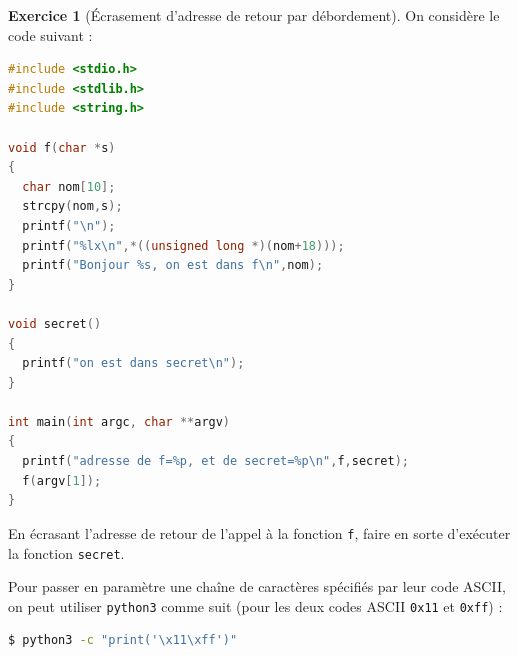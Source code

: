 \documentclass[a4paper,11pt]{article}
\theoremstyle{plain}
\theoremstyle{definition}
\newtheorem{exercice}{Exercice}
\begin{document}

\begin{exercice}[Écrasement d'adresse de retour par débordement]
On considère le code suivant :
\begin{lstlisting}[language=C]
#include <stdio.h>
#include <stdlib.h>
#include <string.h>

void f(char *s)
{
  char nom[10];
  strcpy(nom,s);
  printf("\n");
  printf("%lx\n",*((unsigned long *)(nom+18)));
  printf("Bonjour %s, on est dans f\n",nom);
}

void secret()
{
  printf("on est dans secret\n");
}

int main(int argc, char **argv)
{
  printf("adresse de f=%p, et de secret=%p\n",f,secret);
  f(argv[1]);
}
\end{lstlisting}
En écrasant l'adresse de retour de l'appel à la fonction \texttt{f}, faire en sorte d'exécuter la fonction \texttt{secret}.

\begin{attention}
Pour passer en paramètre une chaîne de caractères spécifiés par leur code ASCII, on peut utiliser \texttt{python3} comme suit (pour les deux codes ASCII \texttt{0x11} et \texttt{0xff}) :
\begin{lstlisting}[language=bash,numbers=none]
$ python3 -c "print('\x11\xff')"
\end{lstlisting}
\end{attention}
\end{exercice}


\end{document}
